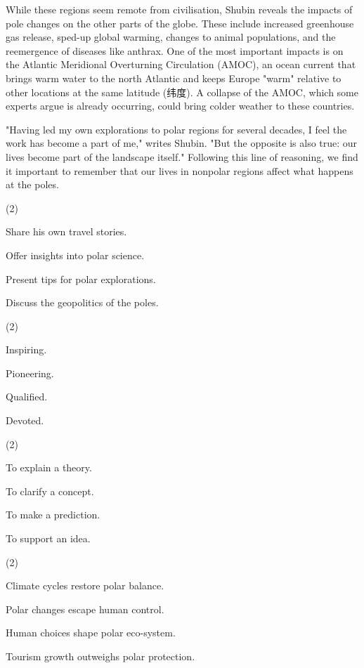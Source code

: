 \documentclass{英语试卷}
\begin{document}
\par While these regions seem remote from civilisation, Shubin reveals the impacts of pole changes on the other parts of the globe. These include increased greenhouse gas release, sped-up global warming, changes to animal populations, and the reemergence of diseases like anthrax. One of the most important impacts is on the Atlantic Meridional Overturning Circulation (AMOC), an ocean current that brings warm water to the north Atlantic and keeps Europe "warm" relative to other locations at the same latitude (纬度). A collapse of the AMOC, which some experts argue is already occurring, could bring colder weather to these countries.\par
\par "Having led my own explorations to polar regions for several decades, I feel the work has become a part of me," writes Shubin. "But the opposite is also true: our lives become part of the landscape itself." Following this line of reasoning, we find it important to remember that our lives in nonpolar regions affect what happens at the poles.\par
{}
\begin{choices}(2)
  \item Share his own travel stories.
  \item Offer insights into polar science.
  \item Present tips for polar explorations.
  \item Discuss the geopolitics of the poles.
\end{choices}
\begin{choices}(2)
  \item Inspiring.
  \item Pioneering.
  \item Qualified.
  \item Devoted.
\end{choices}
\begin{choices}(2)
  \item To explain a theory.
  \item To clarify a concept.
  \item To make a prediction.
  \item To support an idea.
\end{choices}
\begin{choices}(2)
  \item Climate cycles restore polar balance.
  \item Polar changes escape human control.
  \item Human choices shape polar eco-system.
  \item Tourism growth outweighs polar protection.
\end{choices}
\end{document}
